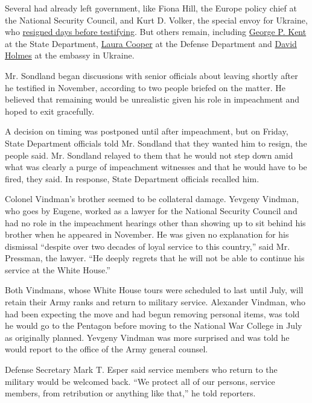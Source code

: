 Several had already left government, like Fiona Hill, the Europe policy
chief at the National Security Council, and Kurt D. Volker, the special
envoy for Ukraine, who
\href{https://www.nytimes.com/2019/09/27/us/politics/volker-ukraine-resigns.html}{resigned
days before testifying}. But others remain, including
\href{https://www.nytimes.com/2019/11/13/us/politics/who-is-george-kent.html}{George
P. Kent} at the State Department,
\href{https://www.nytimes.com/2019/11/20/us/politics/laura-cooper-impeachment.html}{Laura
Cooper} at the Defense Department and
\href{https://www.nytimes.com/2019/11/21/us/politics/david-holmes-impeachment.html}{David
Holmes} at the embassy in Ukraine.

Mr. Sondland began discussions with senior officials about leaving
shortly after he testified in November, according to two people briefed
on the matter. He believed that remaining would be unrealistic given his
role in impeachment and hoped to exit gracefully.

A decision on timing was postponed until after impeachment, but on
Friday, State Department officials told Mr. Sondland that they wanted
him to resign, the people said. Mr. Sondland relayed to them that he
would not step down amid what was clearly a purge of impeachment
witnesses and that he would have to be fired, they said. In response,
State Department officials recalled him.

Colonel Vindman's brother seemed to be collateral damage. Yevgeny
Vindman, who goes by Eugene, worked as a lawyer for the National
Security Council and had no role in the impeachment hearings other than
showing up to sit behind his brother when he appeared in November. He
was given no explanation for his dismissal ``despite over two decades of
loyal service to this country,'' said Mr. Pressman, the lawyer. ``He
deeply regrets that he will not be able to continue his service at the
White House.''

Both Vindmans, whose White House tours were scheduled to last until
July, will retain their Army ranks and return to military service.
Alexander Vindman, who had been expecting the move and had begun
removing personal items, was told he would go to the Pentagon before
moving to the National War College in July as originally planned.
Yevgeny Vindman was more surprised and was told he would report to the
office of the Army general counsel.

Defense Secretary Mark T. Esper said service members who return to the
military would be welcomed back. ``We protect all of our persons,
service members, from retribution or anything like that,'' he told
reporters.

